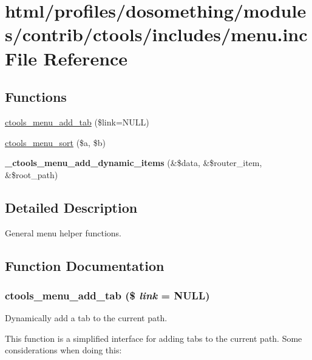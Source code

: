 \hypertarget{menu_8inc}{
\section{html/profiles/dosomething/modules/contrib/ctools/includes/menu.inc File Reference}
\label{menu_8inc}
}
\subsection*{Functions}
\begin{DoxyCompactItemize}
\item 
\hyperlink{menu_8inc_abe055cbfacd9bdd8c0ecb45bfa2bf304}{ctools\_\-menu\_\-add\_\-tab} (\$link=NULL)
\item 
\hyperlink{menu_8inc_a4175eeb345ac720cbe0f27042cce1fa6}{ctools\_\-menu\_\-sort} (\$a, \$b)
\item 
\hypertarget{menu_8inc_a5541c20154547ef71f8eb3dfcc1cc564}{
{\bfseries \_\-ctools\_\-menu\_\-add\_\-dynamic\_\-items} (\&\$data, \&\$router\_\-item, \&\$root\_\-path)}
\label{menu_8inc_a5541c20154547ef71f8eb3dfcc1cc564}

\end{DoxyCompactItemize}


\subsection{Detailed Description}
General menu helper functions. 

\subsection{Function Documentation}
\hypertarget{menu_8inc_abe055cbfacd9bdd8c0ecb45bfa2bf304}{
\subsubsection[{ctools\_\-menu\_\-add\_\-tab}]{\setlength{\rightskip}{0pt plus 5cm}ctools\_\-menu\_\-add\_\-tab (\$ {\em link} = {\ttfamily NULL})}}
\label{menu_8inc_abe055cbfacd9bdd8c0ecb45bfa2bf304}
Dynamically add a tab to the current path.

This function is a simplified interface for adding tabs to the current path. Some considerations when doing this:


